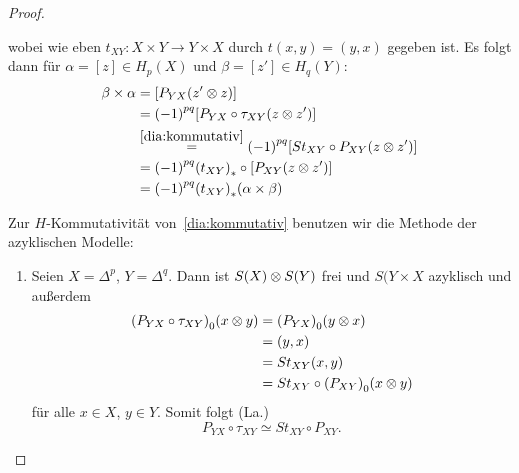 \begin{proof}
\begin{enumerate}
\begin{cd*}
      \end{cd*}
      wobei wie eben $t_{XY} \colon X \times Y \to Y \times X$ durch $t(x,y) = (y,x)$ gegeben ist.
      Es folgt dann für $\alpha = [z] \in H_p(X)$ und $\beta = [z'] \in H_q(Y)$:
      \begin{align*}
        \beta \times \alpha
        & = [ P_{YX} (z' \otimes z) ] \\
        & = {(-1)}^{pq} [ P_{YX} \circ \tau_{XY} (z \otimes z') ] \\
        & \overset{\eqref{dia:kommutativ}}{=}
          {(-1)}^{pq} [ S t_{XY} \circ P_{XY} (z \otimes z') ] \\
        & = {(-1)}^{pq} {(t_{XY})}_* \circ [ P_{XY} (z \otimes z') ] \\
        & = {(-1)}^{pq} {(t_{XY})}_{*} (\alpha \times \beta)
      \end{align*}

      Zur $H$-Kommutativität von~\eqref{dia:kommutativ} benutzen wir die Methode der azyklischen Modelle:
      \begin{enumerate}
        \item
          Seien $X = \Delta^p$, $Y = \Delta^q$.
          Dann ist $S(X) \otimes S(Y)$ frei und $S(Y \times X$ azyklisch und außerdem
          \begin{align*}
            {(P_{YX} \circ \tau_{XY})}_0 (x \otimes y)
            & = {(P_{YX})}_0 (y \otimes x) \\
            & = (y,x) \\
            & = S t_{XY} (x, y) \\
            & = S t_{XY} \circ {(P_{XY})}_0 (x \otimes y)
          \end{align*}
          für alle $x \in X$, $y \in Y$.
          Somit folgt (La.)
          \begin{equation*}
            P_{YX} \circ \tau_{XY} \simeq S t_{XY} \circ P_{XY}.
          \end{equation*}


\end{enumerate}
\end{enumerate}
\end{proof}
